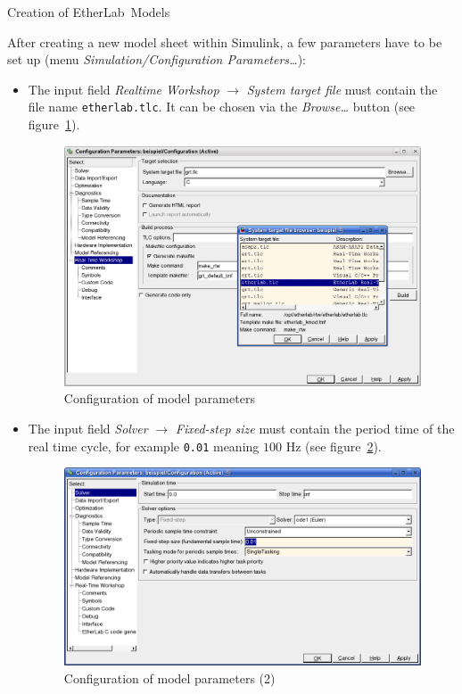 \begin{ighsec}{Creation of EtherLab\regTM\ Models}
\label{sec:modelle}

After creating a new model sheet within Simulink, a few parameters have to be
set up (menu \textit{Simulation/Configuration Parameters\ldots}):

\begin{itemize}
\item The input field \textit{Realtime Workshop} $\rightarrow$
  \textit{System target file} must contain the file name
  \texttt{etherlab.tlc}. It can be chosen via the
  \textit{Browse\ldots} button (see figure~\ref{fig:konfiguration}).
  \begin{figure}[H]
    \begin{center}
      \includegraphics[width=.9\textwidth]{images/config_param.png}
      \caption{Configuration of model parameters}
      \label{fig:konfiguration}
    \end{center}
  \end{figure}
\item The input field \textit{Solver} $\rightarrow$ \textit{Fixed-step
    size} must contain the period time of the real time cycle, for
  example \texttt{0.01} meaning $100$ Hz (see
  figure~\ref{fig:config_solver}).
  \begin{figure}[H]
    \begin{center}
      \includegraphics[width=.9\textwidth]{images/config_solver.png}
      \caption{Configuration of model parameters (2)}
      \label{fig:config_solver}
    \end{center}
  \end{figure}
\end{itemize}


\end{ighsec}
